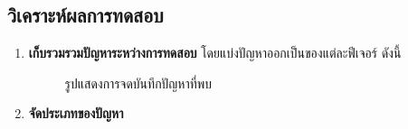 \subsection{วิเคราะห์ผลการทดสอบ}
\begin{enumerate}
    \item \textbf{เก็บรวมรวมปัญหาระหว่างการทดสอบ} โดยแบ่งปัญหาออกเป็นของแต่ละฟีเจอร​์ ดังนี้
          \begin{figure}[H]\centering
              \caption{รูปแสดงการจดบันทึกปัญหาที่พบ}\label{fig:GateringIssue}
          \end{figure}
    \item \textbf{จัดประเภทของปัญหา}
          \begin{figure}[H]\centering

\end{figure}
\end{enumerate}

